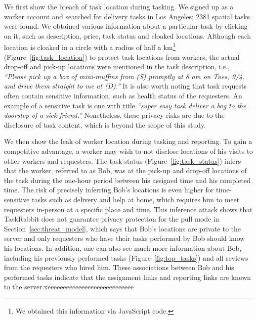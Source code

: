 \documentclass{USC-Thesis}
\numberwithin{equation}{chapter}
\begin{document}
We first show the breach of task location during tasking. 
We signed up as a worker account and searched for delivery tasks in Los Angeles; 2381 spatial tasks were found. We obtained various information about a particular task by clicking on it, such as description, price, task status and cloaked locations. Although each location is cloaked in a circle with a radius of half a km\footnote{We obtained this information via JavaScript code.} (Figure~\ref{fig:task_location}) to protect task locations from workers, the actual drop-off and pick-up locations were mentioned in the task description, i.e., \emph{``Please pick up a box of mini-muffins from (S) promptly at 8 am on Tues, 9/4, and drive them straight to me at (D).''}
It is also worth noting that task requests often contain sensitive information, such as health status of the requesters. An example of a sensitive task is one with title \emph{``super easy task deliver a bag to the doorstep of a sick friend.''}
Nonetheless, these privacy risks are due to the disclosure of task content, which is beyond the scope of this study.

We then show the leak of worker location during tasking and reporting. To gain a competitive advantage, a worker may wish to not disclose locations of his visits to other workers and requesters.
The task status (Figure~\ref{fig:task_status}) infers that the worker, referred to as Bob, was at the pick-up and drop-off locations of the task during the one-hour period between his assigned time and his completed time. The risk of precisely inferring Bob's locations is even higher for time-sensitive tasks such as delivery and help at home, which requires him to meet requesters in-person at a specific place and time. This inference attack shows that TaskRabbit does not guarantee privacy protection for the pull mode in Section~\ref{sec:threat_model}, which says that Bob's locations are private to the server and only requesters who have their tasks performed by Bob should know his locations.
In addition, one can also see much more information about Bob, including his previously performed tasks (Figure~\ref{fig:top_tasks}) and all reviews from the requesters who hired him. These associations between Bob and his performed tasks indicate that the assignment links and reporting links are known to the server.xeeeeeeeeeeeeeeeeeeeeeeeeeeee
\end{document}
